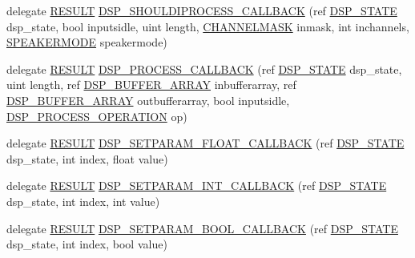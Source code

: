 \begin{DoxyCompactItemize}
\item 
delegate \hyperlink{namespace_f_m_o_d_a305d1176ef3f8c8815861a60407ac33d}{R\+E\+S\+U\+LT} \hyperlink{namespace_f_m_o_d_a20f7f3a049e0fa5d089b0cfd44b348b5}{D\+S\+P\+\_\+\+S\+H\+O\+U\+L\+D\+I\+P\+R\+O\+C\+E\+S\+S\+\_\+\+C\+A\+L\+L\+B\+A\+CK} (ref \hyperlink{struct_f_m_o_d_1_1_d_s_p___s_t_a_t_e}{D\+S\+P\+\_\+\+S\+T\+A\+TE} dsp\+\_\+state, bool inputsidle, uint length, \hyperlink{namespace_f_m_o_d_ae295945ff00acb5f2e5ef0b3f217f5e2}{C\+H\+A\+N\+N\+E\+L\+M\+A\+SK} inmask, int inchannels, \hyperlink{namespace_f_m_o_d_aa0732e7e8efd3b96b526a7f2f8479634}{S\+P\+E\+A\+K\+E\+R\+M\+O\+DE} speakermode)
\item 
delegate \hyperlink{namespace_f_m_o_d_a305d1176ef3f8c8815861a60407ac33d}{R\+E\+S\+U\+LT} \hyperlink{namespace_f_m_o_d_a0dc8b7058b8085af4c8a354b9313163d}{D\+S\+P\+\_\+\+P\+R\+O\+C\+E\+S\+S\+\_\+\+C\+A\+L\+L\+B\+A\+CK} (ref \hyperlink{struct_f_m_o_d_1_1_d_s_p___s_t_a_t_e}{D\+S\+P\+\_\+\+S\+T\+A\+TE} dsp\+\_\+state, uint length, ref \hyperlink{struct_f_m_o_d_1_1_d_s_p___b_u_f_f_e_r___a_r_r_a_y}{D\+S\+P\+\_\+\+B\+U\+F\+F\+E\+R\+\_\+\+A\+R\+R\+AY} inbufferarray, ref \hyperlink{struct_f_m_o_d_1_1_d_s_p___b_u_f_f_e_r___a_r_r_a_y}{D\+S\+P\+\_\+\+B\+U\+F\+F\+E\+R\+\_\+\+A\+R\+R\+AY} outbufferarray, bool inputsidle, \hyperlink{namespace_f_m_o_d_a4972a4698fe1c6d24a9b2f3704dfe42e}{D\+S\+P\+\_\+\+P\+R\+O\+C\+E\+S\+S\+\_\+\+O\+P\+E\+R\+A\+T\+I\+ON} op)
\item 
delegate \hyperlink{namespace_f_m_o_d_a305d1176ef3f8c8815861a60407ac33d}{R\+E\+S\+U\+LT} \hyperlink{namespace_f_m_o_d_a9bed3a515f9c85842fd2e3667ee82d7f}{D\+S\+P\+\_\+\+S\+E\+T\+P\+A\+R\+A\+M\+\_\+\+F\+L\+O\+A\+T\+\_\+\+C\+A\+L\+L\+B\+A\+CK} (ref \hyperlink{struct_f_m_o_d_1_1_d_s_p___s_t_a_t_e}{D\+S\+P\+\_\+\+S\+T\+A\+TE} dsp\+\_\+state, int index, float value)
\item 
delegate \hyperlink{namespace_f_m_o_d_a305d1176ef3f8c8815861a60407ac33d}{R\+E\+S\+U\+LT} \hyperlink{namespace_f_m_o_d_ac198fafe4f8f8a3c34870daa4d5d64e6}{D\+S\+P\+\_\+\+S\+E\+T\+P\+A\+R\+A\+M\+\_\+\+I\+N\+T\+\_\+\+C\+A\+L\+L\+B\+A\+CK} (ref \hyperlink{struct_f_m_o_d_1_1_d_s_p___s_t_a_t_e}{D\+S\+P\+\_\+\+S\+T\+A\+TE} dsp\+\_\+state, int index, int value)
\item 
delegate \hyperlink{namespace_f_m_o_d_a305d1176ef3f8c8815861a60407ac33d}{R\+E\+S\+U\+LT} \hyperlink{namespace_f_m_o_d_a1c87fb972d6140c479b23f30c459b3f0}{D\+S\+P\+\_\+\+S\+E\+T\+P\+A\+R\+A\+M\+\_\+\+B\+O\+O\+L\+\_\+\+C\+A\+L\+L\+B\+A\+CK} (ref \hyperlink{struct_f_m_o_d_1_1_d_s_p___s_t_a_t_e}{D\+S\+P\+\_\+\+S\+T\+A\+TE} dsp\+\_\+state, int index, bool value)

\end{DoxyCompactItemize}
